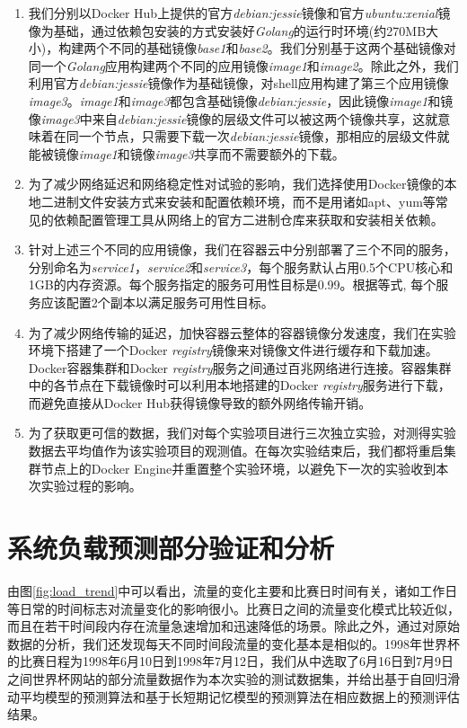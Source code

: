\begin{enumerate}
\item\label{req:serv_image} 我们分别以Docker Hub上提供的官方\emph{debian:jessie}镜像和官方\emph{ubuntu:xenial}镜像为基础，通过依赖包安装的方式安装好\emph{Golang}的运行时环境(约270MB大小)，构建两个不同的基础镜像\emph{base1}和\emph{base2}。我们分别基于这两个基础镜像对同一个\emph{Golang}应用构建两个不同的应用镜像\emph{image1}和\emph{image2}。除此之外，我们利用官方\emph{debian:jessie}镜像作为基础镜像，对shell应用构建了第三个应用镜像\emph{image3}。\emph{image1}和\emph{image3}都包含基础镜像\emph{debian:jessie}，因此镜像\emph{image1}和镜像\emph{image3}中来自\emph{debian:jessie}镜像的层级文件可以被这两个镜像共享，这就意味着在同一个节点，只需要下载一次\emph{debian:jessie}镜像，那相应的层级文件就能被镜像\emph{image1}和镜像\emph{image3}共享而不需要额外的下载。

\item 为了减少网络延迟和网络稳定性对试验的影响，我们选择使用Docker镜像的本地二进制文件安装方式来安装和配置依赖环境，而不是用诸如apt、yum等常见的依赖配置管理工具从网络上的官方二进制仓库来获取和安装相关依赖。

\item\label{req:serv_aval} 针对上述三个不同的应用镜像，我们在容器云中分别部署了三个不同的服务，分别命名为\emph{service1}，\emph{service2}和\emph{service3}，每个服务默认占用0.5个CPU核心和1GB的内存资源。每个服务指定的服务可用性目标是0.99。根据等式, 每个服务应该配置2个副本以满足服务可用性目标。

\item\label{req:registry_mirror} 为了减少网络传输的延迟，加快容器云整体的容器镜像分发速度，我们在实验环境下搭建了一个Docker \emph{registry}镜像来对镜像文件进行缓存和下载加速。Docker容器集群和Docker \emph{registry}服务之间通过百兆网络进行连接。容器集群中的各节点在下载镜像时可以利用本地搭建的Docker \emph{registry}服务进行下载，而避免直接从Docker Hub获得镜像导致的额外网络传输开销。

\item 为了获取更可信的数据，我们对每个实验项目进行三次独立实验，对测得实验数据去平均值作为该实验项目的观测值。在每次实验结束后，我们都将重启集群节点上的Docker Engine并重置整个实验环境，以避免下一次的实验收到本次实验过程的影响。
\end{enumerate}

\section{系统负载预测部分验证和分析}
由图\ref{fig:load_trend}中可以看出，流量的变化主要和比赛日时间有关，诸如工作日等日常的时间标志对流量变化的影响很小。比赛日之间的流量变化模式比较近似，而且在若干时间段内存在流量急速增加和迅速降低的场景。除此之外，通过对原始数据的分析，我们还发现每天不同时间段流量的变化基本是相似的。1998年世界杯的比赛日程为1998年6月10日到1998年7月12日，我们从中选取了6月16日到7月9日之间世界杯网站的部分流量数据作为本次实验的测试数据集，并给出基于自回归滑动平均模型的预测算法和基于长短期记忆模型的预测算法在相应数据上的预测评估结果。

